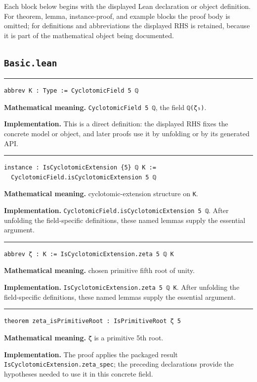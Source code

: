 \documentclass[UTF8,a4paper,11pt,fontset=fandol]{ctexart}
\theoremstyle{definition}
\newcommand{\statementsep}{\par\medskip\hrule\medskip}
\begin{document}
Each block below begins with the displayed Lean declaration or object definition. For theorem, lemma, instance-proof, and example blocks the proof body is omitted; for definitions and abbreviations the displayed RHS is retained, because it is part of the mathematical object being documented.

\subsection{\texttt{Basic.lean}}

\statementsep
\begin{verbatim}
abbrev K : Type := CyclotomicField 5 ℚ
\end{verbatim}
\noindent\textbf{Mathematical meaning.} \texttt{CyclotomicField 5 ℚ}, the field \texttt{ℚ(ζ₅)}.\par
\noindent\textbf{Implementation.} This is a direct definition: the displayed RHS fixes the concrete model or object, and later proofs use it by unfolding or by its generated API.\par
\statementsep
\begin{verbatim}
instance : IsCyclotomicExtension {5} ℚ K :=
  CyclotomicField.isCyclotomicExtension 5 ℚ
\end{verbatim}
\noindent\textbf{Mathematical meaning.} cyclotomic-extension structure on \texttt{K}.\par
\noindent\textbf{Implementation.} \texttt{CyclotomicField.\allowbreak{}isCyclotomicExtension 5 ℚ}. After unfolding the field-specific definitions, these named lemmas supply the essential argument.\par
\statementsep
\begin{verbatim}
abbrev ζ : K := IsCyclotomicExtension.zeta 5 ℚ K
\end{verbatim}
\noindent\textbf{Mathematical meaning.} chosen primitive fifth root of unity.\par
\noindent\textbf{Implementation.} \texttt{IsCyclotomicExtension.\allowbreak{}zeta 5 ℚ K}. After unfolding the field-specific definitions, these named lemmas supply the essential argument.\par
\statementsep
\begin{verbatim}
theorem zeta_isPrimitiveRoot : IsPrimitiveRoot ζ 5
\end{verbatim}
\noindent\textbf{Mathematical meaning.} \texttt{ζ} is a primitive 5th root.\par
\noindent\textbf{Implementation.} The proof applies the packaged result \texttt{IsCyclotomicExtension.\allowbreak{}zeta\_\allowbreak{}spec}; the preceding declarations provide the hypotheses needed to use it in this concrete field.\par
\end{document}
